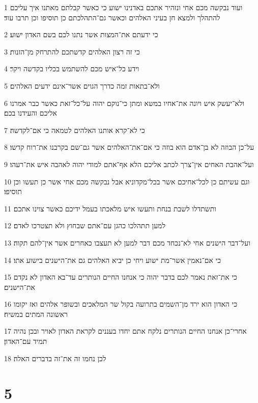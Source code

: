 \par 1 ועוד נבקשה מכם אחי ונזהיר אתכם באדנינו ישוע כי כאשר קבלתם מאתנו איך עליכם להתהלך ולמצא חן בעיני האלהים וכאשר גם־התהלכתם כן תוסיפו וכן תרבו עוד׃
\par 2 כי ידעתם את־המצות אשר נתנו לכם בשם האדון ישוע׃
\par 3 כי זה רצון האלהים קדשתכם להתרחק מן־הזנות׃
\par 4 וידע כל־איש מכם להשתמש בכליו בקדשה ויקר׃
\par 5 ולא־בתאות זמה כדרך הגוים אשר־אינם ידעים האלהים׃
\par 6 ולא־יעשק איש ויונה את־אחיו במשא ומתן כי־נוקם יהוה על־כל־זאת כאשר כבר אמרנו אליכם והעידנו בכם׃
\par 7 כי לא־קרא אותנו האלהים לטמאה כי אם־לקדשה׃
\par 8 על־כן הבוזה לא בן־אדם הוא בוזה כי אם־את־האלהים אשר גם־שם בקרבנו את־רוח קדשו׃
\par 9 ועל־אהבת האחים אין־צרך לכתב אליכם הלא אף־אתם למודי יהוה לאהבה איש את־רעהו׃
\par 10 וגם עשיתם כן לכל־אחיכם אשר בכל־מקדוניא אבל נבקשה מכם אחי אשר כן תעשו וכן תוסיפו׃
\par 11 ותשתדלו לשבת בנחת ותעשו איש מלאכתו בעמל ידיכם כאשר צוינו אתכם׃
\par 12 למען תתהלכו כהגן עם־אתם שבחוץ ולא תצטרכו לאדם׃
\par 13 ועל־דבר הישנים אחי לא־נכחד מכם דבר למען לא תעצבו כאחרים אשר אין־להם תקוה׃
\par 14 כי אם־נאמין אשר־מת ישוע ויחי כן יביא האלהים גם את־הישנים בישוע אתו׃
\par 15 כי את־זאת נאמר לכם בדבר יהוה כי אנחנו החיים הנותרים עד־בא האדון לא נקדם את־הישנים׃
\par 16 כי האדון הוא ירד מן־השמים בתרועה בקול שר המלאכים ובשופר אלהים ואז יקומו ראשונה המתים במשיח׃
\par 17 אחרי־כן אנחנו החיים הנותרים נלקח אתם יחדו בעננים לקראת האדון לאויר ובכן נהיה תמיד עם־האדון׃
\par 18 לכן נחמו זה את־זה בדברים האלה׃

\chapter{5}

